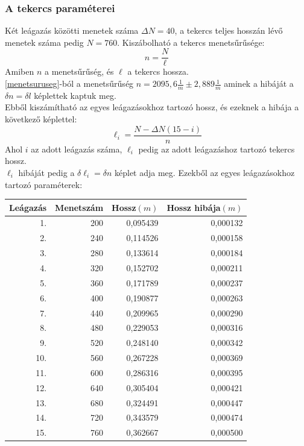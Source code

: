 \documentclass[10pt,pdftex]{report}
\begin{document}
\subsubsection{A tekercs paraméterei}
Két leágazás közötti menetek száma $\Delta N = 40$, a tekercs teljes hosszán lévő menetek száma pedig $N=760$.
Kiszábolható a tekercs menetsűrűsége:
\begin{equation}
    n = \frac{N}{\ell} \label{menetsuruseg}
\end{equation}
Amiben $n$ a menetsűrűség, és $\ell$ a tekercs hossza.\\ \ref{menetsuruseg}-ból a menetsűrűség  $n=2095,6\frac{1}{m}\pm2,889\frac{1}{m}$
aminek a hibáját a $\delta n=\delta l$ képlettek kaptuk meg.\\Ebből kiszámítható az egyes leágazásokhoz tartozó hossz, és ezeknek a hibája
a következő képlettel:
\begin{equation}
    \ell_i=\frac{N - \Delta N \left(15 - i\right)}{n}
\end{equation}
Ahol $i$ az adott leágazás száma, $\ell_i$ pedig az adott leágazáshoz tartozó tekercs hossz.\\ $\ell_i$ hibáját pedig a $\delta\ell_i=\delta n$ képlet adja meg.
Ezekből az egyes leágazásokhoz tartozó paraméterek:\newline
\begin{centering}
    \centering
    \begin{tabular}{|r|r|r|r|}
        \hline
        Leágazás & Menetszám & Hossz$(m)$ & Hossz hibája$(m)$\\
        \hline
        1. & 200 & 0,095439 & 0,000132 \\
        \hline
        2. & 240 & 0,114526 & 0,000158 \\
        \hline
        3. & 280 & 0,133614 & 0,000184 \\
        \hline
        4. & 320 & 0,152702 & 0,000211 \\
        \hline
        5. & 360 & 0,171789 & 0,000237 \\
        \hline
        6. & 400 & 0,190877 & 0,000263 \\
        \hline
        7. & 440 & 0,209965 & 0,000290 \\
        \hline
        8. & 480 & 0,229053 & 0,000316 \\
        \hline
        9. & 520 & 0,248140 & 0,000342 \\
        \hline
        10. & 560 & 0,267228 & 0,000369 \\
        \hline
        11. & 600 & 0,286316 & 0,000395 \\
        \hline
        12. & 640 & 0,305404 & 0,000421 \\
        \hline
        13. & 680 & 0,324491 & 0,000447 \\
        \hline
        14. & 720 & 0,343579 & 0,000474 \\
        \hline
        15. & 760 & 0,362667 & 0,000500 \\
        \hline
    \end{tabular}
\end{centering}
\end{document}
